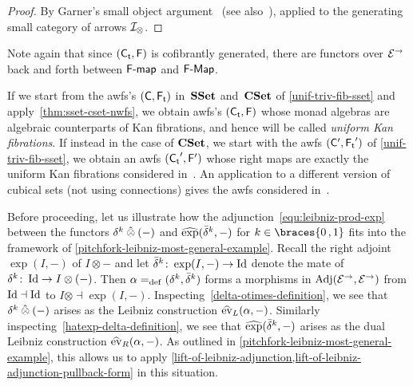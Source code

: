 \documentclass[reqno,10pt,a4paper,oneside,draft]{amsart}
\begin{document}
{{\begin{proof}
By Garner's small object argument~\cite{garner:small-object-argument} (see also~\cite[Proposition~16]{bourke-garner-I}), applied to the generating small category of arrows $\cal{I}_\otimes$.  
\end{proof}

Note again that since $(\TC, \FF)$ is cofibrantly generated, there are functors over $\cal{E}^\to$ back and forth between $\palg{\FF}$ and $\pAlg{\FF}$.

\begin{example} \label{unif-fib-sset}
If we start from the awfs's $(\CC, \TF)$ in~$\SSet$ and~$\CSet$ of \cref{unif-triv-fib-sset} and apply~\cref{thm:sset-cset-nwfs}, we obtain awfs's $(\TC, \FF)$ whose monad algebras are algebraic counterparts of Kan fibrations, and hence will be called \emph{uniform Kan fibrations}.
If instead in the case of $\CSet$, we start with the awfs $(\CC', \TF')$ of \cref{unif-triv-fib-sset}, we obtain an awfs $(\TC', \FF')$ whose right maps are exactly the uniform Kan fibrations considered in~\cite{cohen-et-al:cubicaltt}.
An application to a different version of cubical sets (not using connections) gives the awfs considered in~\cite{swan-awfs}.
\end{example}

\begin{remark} \label{pitchfork-leibniz-instance}
Before proceeding, let us illustrate how the adjunction~\eqref{equ:leibniz-prod-exp} between the functors $\delta^k \hatotimes (-)$ and $\hatexp(\bar{\delta}^k, -)$ for $k \in \braces{0\,,1}$ fits into the framework of \cref{pitchfork-leibniz-most-general-example}.
Recall the right adjoint $\exp(I, -)$ of $I \otimes -$ and let $\bar{\delta}^k \co \exp(I, -) \to \Id$ denote the mate of $\delta^k \co \Id \to I \otimes (-)$.
Then $\alpha \defeq (\delta^k, \bar{\delta}^k)$ forms a morphisms in $\Adj(\cal{E}^\to, \cal{E}^\to)$ from $\Id \dashv \Id$ to $I \otimes \dashv \exp(I, -)$.
Inspecting~\eqref{delta-otimes-definition}, we see that $\delta^k \hatotimes (-)$ arises as the Leibniz construction $\hateval_L(\alpha, -)$.
Similarly inspecting~\eqref{hatexp-delta-definition}, we see that $\hatexp(\bar{\delta}^k, -)$ arises as the dual Leibniz construction $\hateval_R(\alpha, -)$.
As outlined in \cref{pitchfork-leibniz-most-general-example}, this allows us to apply \cref{lift-of-leibniz-adjunction,lift-of-leibniz-adjunction-pullback-form} in this situation.
\end{remark}

}}
\end{document}
